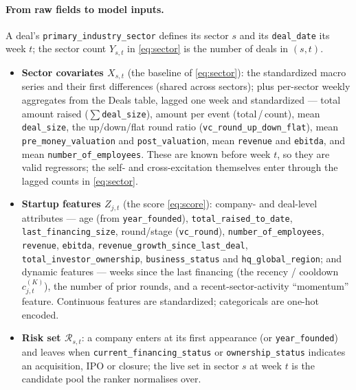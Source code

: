 \documentclass[11pt]{article}
\newcommand{\code}[1]{\texttt{#1}}
\newcommand{\Rset}{\mathcal{R}}
\begin{document}
\paragraph{From raw fields to model inputs.} A deal's \code{primary\_industry\_sector}
defines its sector $s$ and its \code{deal\_date} its week $t$; the sector count
$Y_{s,t}$ in \eqref{eq:sector} is the number of deals in $(s,t)$.
\begin{itemize}[leftmargin=1.4em,itemsep=2pt]
\item \textbf{Sector covariates $X_{s,t}$} (the baseline of \eqref{eq:sector}): the
standardized macro series and their first differences (shared across sectors); plus
per-sector weekly aggregates from the Deals table, lagged one week and standardized ---
total amount raised ($\sum$\code{deal\_size}), amount per event (total\,/\,count), mean
\code{deal\_size}, the up/down/flat round ratio (\code{vc\_round\_up\_down\_flat}), mean
\code{pre\_money\_valuation} and \code{post\_valuation}, mean \code{revenue} and
\code{ebitda}, and mean \code{number\_of\_employees}. These are known before week $t$,
so they are valid regressors; the self- and cross-excitation themselves enter through
the lagged counts in \eqref{eq:sector}.
\item \textbf{Startup features $Z_{j,t}$} (the score \eqref{eq:score}): company- and
deal-level attributes --- age (from \code{year\_founded}), \code{total\_raised\_to\_date},
\code{last\_financing\_size}, round/stage (\code{vc\_round}), \code{number\_of\_employees},
\code{revenue}, \code{ebitda}, \code{revenue\_growth\_since\_last\_deal},
\code{total\_investor\_ownership}, \code{business\_status} and \code{hq\_global\_region};
and dynamic features --- weeks since the last financing (the recency / cooldown
$c^{(K)}_{j,t}$), the number of prior rounds, and a recent-sector-activity ``momentum''
feature. Continuous features are standardized; categoricals are one-hot encoded.
\item \textbf{Risk set $\Rset_{s,t}$}: a company enters at its first appearance (or
\code{year\_founded}) and leaves when \code{current\_financing\_status} or
\code{ownership\_status} indicates an acquisition, IPO or closure; the live set in sector
$s$ at week $t$ is the candidate pool the ranker normalises over.
\end{itemize}
\end{document}
